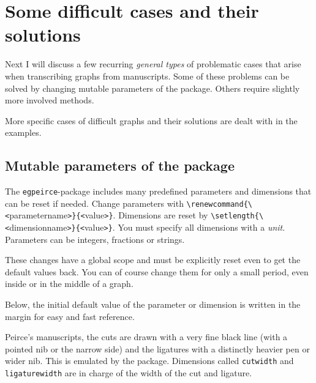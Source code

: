 \documentclass[a4paper,justified]{tufte-handout}
\begin{document}
\newpage
\notinlinetrue

\section{\hspace*{-15pt}Some difficult cases and their solutions}

Next I will discuss a few recurring \textit{general types} of problematic cases that arise when transcribing graphs from manuscripts. Some of these problems can be solved by changing mutable parameters of the package. Others require slightly more involved methods.

More specific cases of difficult graphs and their solutions are dealt with in the examples.

\subsection{\hspace*{-8pt}Mutable parameters of the package}

The \texttt{egpeirce}-package includes many predefined parameters and dimensions that can be reset if needed. Change parameters with \verb|\renewcommand{\<|{\Fontauri parametername}\verb|>}{<|{\Fontauri value}\verb|>}|. Dimensions are reset by \verb|\setlength{\<|{\Fontauri dimensionname}\verb|>}{<|{\Fontauri value}\verb|>}|. You must specify all dimensions with a \textit{unit}. Parameters can be integers, fractions or strings.

These changes have a global scope and must be explicitly reset even to get the default values back. You can of course change them for only a small period, even inside or in the middle of a graph.

Below, the initial default value of the parameter or dimension is written in the margin for easy and fast reference.

 Peirce's manuscripts, the cuts are drawn with a very fine black line (with a pointed nib or the narrow side) and the ligatures with a distinctly heavier pen or wider nib. This is emulated by the package. Dimensions called \texttt{cutwidth} and \texttt{ligaturewidth} are in charge of the width of the cut and ligature.%
%
\end{document}

